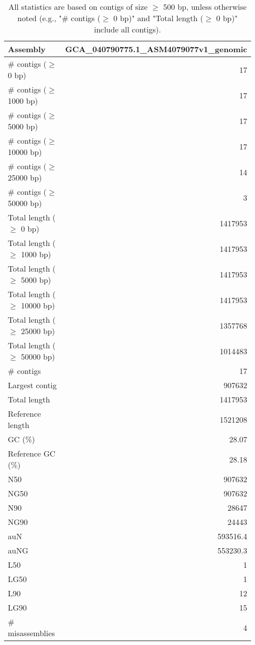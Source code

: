 \documentclass[12pt,a4paper]{article}
\begin{document}
\begin{table}[ht]
\begin{center}
\caption{All statistics are based on contigs of size $\geq$ 500 bp, unless otherwise noted (e.g., "\# contigs ($\geq$ 0 bp)" and "Total length ($\geq$ 0 bp)" include all contigs).}
\begin{tabular}{|l*{1}{|r}|}
\hline
Assembly & GCA\_040790775.1\_ASM4079077v1\_genomic \\ \hline
\# contigs ($\geq$ 0 bp) & 17 \\ \hline
\# contigs ($\geq$ 1000 bp) & 17 \\ \hline
\# contigs ($\geq$ 5000 bp) & 17 \\ \hline
\# contigs ($\geq$ 10000 bp) & 17 \\ \hline
\# contigs ($\geq$ 25000 bp) & 14 \\ \hline
\# contigs ($\geq$ 50000 bp) & 3 \\ \hline
Total length ($\geq$ 0 bp) & 1417953 \\ \hline
Total length ($\geq$ 1000 bp) & 1417953 \\ \hline
Total length ($\geq$ 5000 bp) & 1417953 \\ \hline
Total length ($\geq$ 10000 bp) & 1417953 \\ \hline
Total length ($\geq$ 25000 bp) & 1357768 \\ \hline
Total length ($\geq$ 50000 bp) & 1014483 \\ \hline
\# contigs & 17 \\ \hline
Largest contig & 907632 \\ \hline
Total length & 1417953 \\ \hline
Reference length & 1521208 \\ \hline
GC (\%) & 28.07 \\ \hline
Reference GC (\%) & 28.18 \\ \hline
N50 & 907632 \\ \hline
NG50 & 907632 \\ \hline
N90 & 28647 \\ \hline
NG90 & 24443 \\ \hline
auN & 593516.4 \\ \hline
auNG & 553230.3 \\ \hline
L50 & 1 \\ \hline
LG50 & 1 \\ \hline
L90 & 12 \\ \hline
LG90 & 15 \\ \hline
\# misassemblies & 4 \\ \hline

\end{tabular}
\end{center}
\end{table}
\end{document}
